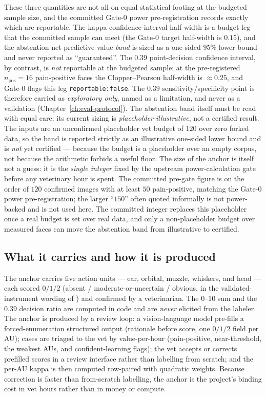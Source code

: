 These three quantities are not all on equal statistical footing at the budgeted
sample size, and the committed Gate-0 power pre-registration records exactly
which are reportable. The kappa confidence-interval half-width is a budget leg
that the committed sample can meet (the Gate-0 target half-width is $0.15$),
and the abstention net-predictive-value \emph{band} is sized as a one-sided
$95\%$ lower bound and never reported as ``guaranteed''. The $0.39$
point-decision confidence interval, by contrast, is \emph{not} reportable at the
budgeted sample: at the pre-registered $n_{\text{pos}}{=}16$ pain-positive faces
the Clopper--Pearson half-width is $\approx 0.25$, and Gate-0 flags this leg
\texttt{reportable:false}. The $0.39$ sensitivity/specificity point is therefore
carried as \emph{exploratory only}, named as a limitation, and never as a
validation (Chapter~\ref{ch:eval-protocol}). The abstention band itself must be read
with equal care: its current sizing is \emph{placeholder-illustrative}, not a
certified result. The inputs are an unconfirmed placeholder vet budget of $120$
over zero forked data, so the band is reported strictly as an illustrative
one-sided lower bound and is \emph{not} yet certified --- because the budget is a
placeholder over an empty corpus, not because the arithmetic forbids a useful
floor. The size of the anchor is itself not a guess: it is the \emph{single
integer} fixed by the upstream power-calculation gate before any veterinary hour
is spent. The committed pre-gate figure is on the order of $120$ confirmed
images with at least $50$ pain-positive, matching the Gate-0 power
pre-registration; the larger ``$150$'' often quoted informally is not
power-backed and is not used here. The committed integer replaces this
placeholder once a real budget is set over real data, and only a non-placeholder
budget over measured faces can move the abstention band from illustrative to
certified.

\subsection{What it carries and how it is produced}

The anchor carries five action units --- ear, orbital, muzzle, whiskers, and
head --- each scored $0/1/2$ (absent / moderate-or-uncertain / obvious, in the
validated-instrument wording of \citealp{evangelista2019}) and confirmed by a
veterinarian. The $0$--$10$ sum and the $0.39$ decision ratio are computed in
code and are \emph{never} elicited from the labeler. The anchor is produced by a
review loop: a vision-language model pre-fills a forced-enumeration structured
output (rationale before score, one $0/1/2$ field per AU); cases are triaged to
the vet by value-per-hour (pain-positive, near-threshold, the weakest AUs, and
confident-learning flags); the vet accepts or corrects prefilled scores in a
review interface rather than labelling from scratch; and the per-AU kappa is then
computed row-paired with quadratic weights. Because correction is faster than
from-scratch labelling, the anchor is the project's binding cost in vet hours
rather than in money or compute.

